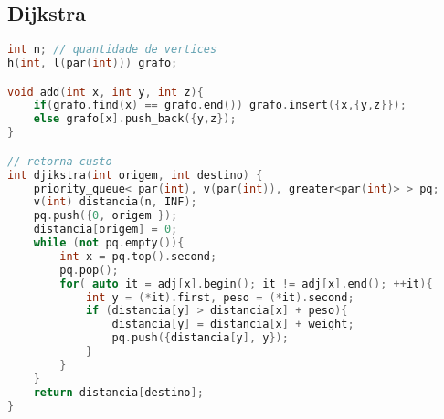 \subsection{Dijkstra}



\begin{lstlisting}[language=C++, title=Usando fila de prioridade]
int n; // quantidade de vertices
h(int, l(par(int))) grafo;

void add(int x, int y, int z){
    if(grafo.find(x) == grafo.end()) grafo.insert({x,{y,z}});
    else grafo[x].push_back({y,z});
}

// retorna custo
int djikstra(int origem, int destino) {
    priority_queue< par(int), v(par(int)), greater<par(int)> > pq;
    v(int) distancia(n, INF);
    pq.push({0, origem });
    distancia[origem] = 0;
    while (not pq.empty()){
        int x = pq.top().second;
        pq.pop();
        for( auto it = adj[x].begin(); it != adj[x].end(); ++it){
            int y = (*it).first, peso = (*it).second;
            if (distancia[y] > distancia[x] + peso){
                distancia[y] = distancia[x] + weight;
                pq.push({distancia[y], y});
            }
        }
    }
    return distancia[destino];
}
\end{lstlisting}
\newpage